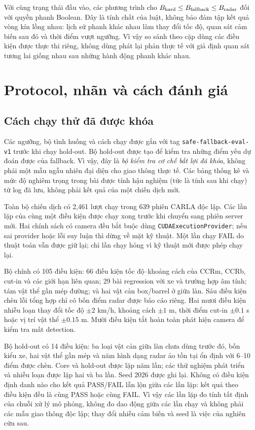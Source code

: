 \documentclass[conference]{IEEEtran}
\begin{document}
Với cùng trạng thái đầu vào, các phương trình cho
$B_{\rm hard}\leq B_{\rm fallback}\leq B_{\rm radar}$ đối với quyền phanh
Boolean. Đây là tính chất của luật, không bảo đảm tập kết quả vòng kín
lồng nhau: lịch sử phanh khác nhau làm thay đổi tốc độ, quan sát cảm biến
sau đó và thời điểm vượt ngưỡng. Vì vậy so sánh theo cặp dùng các điều kiện
được thực thi riêng, không dùng phát lại phản thực tế với giả định quan sát
tương lai giống nhau sau những hành động phanh khác nhau.

\section{Protocol, nhãn và cách đánh giá}
\subsection{Cách chạy thử đã được khóa}
Các ngưỡng, bộ tình huống và cách chạy được gắn với tag
\texttt{safe-fallback-eval-v1} trước khi chạy hold-out. Bộ hold-out được tạo
để kiểm tra những điểm yếu dự đoán được của fallback. Vì vậy, đây là
\emph{bộ kiểm tra cơ chế bất lợi đã khóa}, không phải một mẫu ngẫu nhiên đại
diện cho giao thông thực tế. Các bảng thống kê và mức độ nghiêm trọng trong bài được tính hậu nghiệm
(tức là tính sau khi chạy) từ log đã lưu, không phải kết quả của một chiến dịch mới.

Toàn bộ chiến dịch có 2,461 lượt chạy trong 639 phiên CARLA độc lập. Các lần
lặp của cùng một điều kiện được chạy xong trước khi chuyển sang phiên server
mới. Hai chính sách có camera đều bắt buộc dùng
\texttt{CUDAExecutionProvider}; nếu sai provider hoặc lỗi suy luận thì dừng
về mặt kỹ thuật. Một lần chạy FAIL do thuật toán vẫn được giữ lại; chỉ lần
chạy hỏng vì kỹ thuật mới được phép chạy lại.

Bộ chính có 105 điều kiện: 66 điều kiện tốc độ--khoảng cách của CCRm, CCRb,
cut-in và các giới hạn liên quan; 29 bài regression với xe và trường hợp âm
tính; tám vật thể gần mép đường; và hai vật cản box/barrel ở giữa làn. Sáu
điều kiện chèn lỗi tổng hợp chỉ có bốn điểm radar được báo cáo riêng. Hai mươi
điều kiện nhiễu loạn thay đổi tốc độ $\pm2$ km/h, khoảng cách $\pm1$ m, thời
điểm cut-in $\pm0.1$ s hoặc vị trí vật thể $\pm0.15$ m. Mười điều kiện tắt
hoàn toàn phát hiện camera để kiểm tra mất detection.

Bộ hold-out có 14 điều kiện: ba loại vật cản giữa làn chưa dùng trước đó,
bốn kiểu xe, hai vật thể gần mép và năm hình dạng radar ảo tồn tại ổn định
với 6--10 điểm được chèn. Core và hold-out được lặp năm lần; các thử nghiệm
phát triển và nhiễu loạn được lặp hai và ba lần. Seed 2026 được ghi lại.
Không có điều kiện định danh nào cho kết quả PASS/FAIL lẫn lộn giữa các lần
lặp: kết quả theo điều kiện đều là cùng PASS hoặc cùng FAIL. Vì vậy các lần
lặp đo tính tất định của chuỗi xử lý mô phỏng, không đo dao động giữa các lần
chạy và không phải các mẫu giao thông độc lập; thay đổi nhiễu cảm biến và seed
là việc của nghiên cứu sau.
\end{document}
